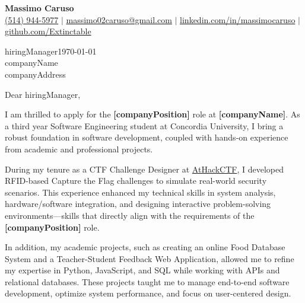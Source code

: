 \documentclass[10pt]{article}
\begin{document}
\newcommand{\fullname}{Massimo Caruso}
\newcommand{\phone}{(514) 944-5977}
\newcommand{\email}{massimo02caruso@gmail.com}
\newcommand{\linkedin}{linkedin.com/in/massimocaruso}
\newcommand{\github}{github.com/Extinctable}

\newcommand*{\hiringManager}{hiringManager}
\newcommand*{\company}{companyName}
\newcommand*{\address}{companyAddress}

\newcommand*{\position}{companyPosition}

\begin{center}
    {\Huge \textbf{\fullname}} \\
    \vspace{1mm}
    {\small 
    \faPhone \hspace{0mm} \href{tel:+15149445977}{\phone} $\vert$ 
    \faEnvelope \hspace{0mm} \href{mailto:massimo02caruso@gmail.com}{\email} $\vert$ 
    \faLinkedin \hspace{0mm} \href{https://linkedin.com/in/massimocaruso}{\linkedin} $\vert$ 
    \faGithub \hspace{0mm} \href{https://github.com/Extinctable}{\github}
    }
\end{center}


\vspace{1.5em}
\hiringManager \hfill \today \\
\company \\
\address 


\vspace{1.5em}
Dear \hiringManager,

I am thrilled to apply for the \textbf{[\position]} role at \textbf{[\company]}. As a third year Software Engineering student at Concordia University, I bring a robust foundation in software development, coupled with hands-on experience from academic and professional projects.

During my tenure as a CTF Challenge Designer at \href{https://www.athackctf.com}{AtHackCTF}, I developed RFID-based Capture the Flag challenges to simulate real-world security scenarios. This experience enhanced my technical skills in system analysis, hardware/software integration, and designing interactive problem-solving environments—skills that directly align with the requirements of the \textbf{[\position]} role.

In addition, my academic projects, such as creating an online Food Database System and a Teacher-Student Feedback Web Application, allowed me to refine my expertise in Python, JavaScript, and SQL while working with APIs and relational databases. These projects taught me to manage end-to-end software development, optimize system performance, and focus on user-centered design.
\end{document}
